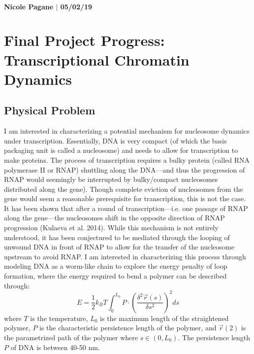 \documentclass[10pt]{article}
\begin{document}
\paragraph{Nicole Pagane $|$ 05/02/19 }

\section*{Final Project Progress: Transcriptional Chromatin Dynamics}

\subsection*{Physical Problem}
I am interested in characterizing a potential mechanism for nucleosome dynamics under transcription. Essentially, DNA is very compact (of which the basis packaging unit is called a nucleosome) and needs to allow for transcription to make proteins. The process of transcription requires a bulky protein (called RNA polymerase II or RNAP) shuttling along the DNA---and thus the progression of RNAP would seemingly be interrupted by bulky/compact nucleosomes distributed along the gene). Though complete eviction of nucleosomes from the gene would seem a reasonable prerequisite for transcription, this is not the case. It has been shown that after a round of transcription---i.e. one passage of RNAP along the gene---the nucleosomes shift in the opposite direction of RNAP progression (Kulaeva et al. 2014). While this mechanism is not entirely understood, it has been conjectured to be mediated through the looping of unwound DNA in front of RNAP to allow for the transfer of the nucleosome upstream to avoid RNAP. I am interested in characterizing this process through modeling DNA as a worm-like chain to explore the energy penalty of loop formation, where the energy required to bend a polymer can be described through:
\begin{equation}
E = \frac{1}{2}k_BT\int_0^{L_0}P\cdot(\frac{\delta^2\vec{r}(s)}{\delta s^2})^2ds
\end{equation}
where $T$ is the temperature, $L_0$ is the maximum length of the straightened polymer, $P$ is the characteristic persistence length of the polymer, and $\vec{r}(2)$ is the parametrized path of the polymer where $s \in (0, L_0)$. The persistence length $P$ of DNA is between 40-50 nm.
\end{document}
